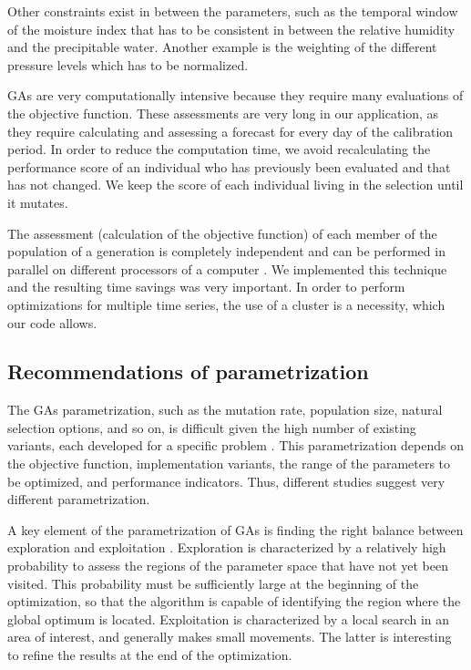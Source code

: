 \documentclass[twocol]{ametsoc}
\begin{document}
Other constraints exist in between the parameters, such as the temporal window of the moisture index that has to be consistent in between the relative humidity and the precipitable water. Another example is the weighting of the different pressure levels which has to be normalized.

GAs are very computationally intensive because they require many evaluations of the objective function. These assessments are very long in our application, as they require calculating and assessing a forecast for every day of the calibration period. In order to reduce the computation time, we avoid recalculating the performance score of an individual who has previously been evaluated and that has not changed. We keep the score of each individual living in the selection until it mutates.

The assessment (calculation of the objective function) of each member of the population of a generation is completely independent and can be performed in parallel on different processors of a computer \citep{Alliot2005}. We implemented this technique and the resulting time savings was very important. In order to perform optimizations for multiple time series, the use of a cluster is a necessity, which our code allows.


\subsection{Recommendations of parametrization}

The GAs parametrization, such as the mutation rate, population size, natural selection options, and so on, is difficult given the high number of existing variants, each developed for a specific problem \citep{Haupt2004, Costa2007a}. This parametrization depends on the objective function, implementation variants, the range of the parameters to be optimized, and performance indicators. Thus, different studies suggest very different parametrization.

A key element of the parametrization of GAs is finding the right balance between exploration and exploitation \citep{Back1992a, Smith1997a}. Exploration is characterized by a relatively high probability to assess the regions of the parameter space that have not yet been visited. This probability must be sufficiently large at the beginning of the optimization, so that the algorithm is capable of identifying the region where the global optimum is located. Exploitation is characterized by a local search in an area of interest, and generally makes small movements. The latter is interesting to refine the results at the end of the optimization.
\end{document}
